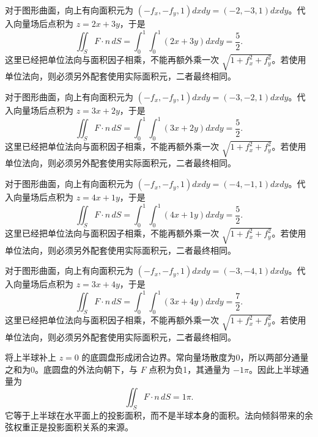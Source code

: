 \documentclass[UTF8,12pt,a4paper,fontset=fandol]{ctexart}
\begin{document}
\begin{solve}\label{ans:c42q9}
对于图形曲面，向上有向面积元为 $(-f_x,-f_y,1)dxdy=(-2,-3,1)dxdy$。代入向量场后点积为 $z=2x+3y$，于是
\[
\iint_SF\cdot n\,dS=\int_0^1\int_0^1(2x+3y)dxdy=\frac{5}{2}.
\]
这里已经把单位法向与面积因子相乘，不能再额外乘一次 $\sqrt{1+f_x^2+f_y^2}$。若使用单位法向，则必须另外配套使用实际面积元，二者最终相同。
\end{solve}

\begin{solve}\label{ans:c42q10}
对于图形曲面，向上有向面积元为 $(-f_x,-f_y,1)dxdy=(-3,-2,1)dxdy$。代入向量场后点积为 $z=3x+2y$，于是
\[
\iint_SF\cdot n\,dS=\int_0^1\int_0^1(3x+2y)dxdy=\frac{5}{2}.
\]
这里已经把单位法向与面积因子相乘，不能再额外乘一次 $\sqrt{1+f_x^2+f_y^2}$。若使用单位法向，则必须另外配套使用实际面积元，二者最终相同。
\end{solve}

\begin{solve}\label{ans:c42q11}
对于图形曲面，向上有向面积元为 $(-f_x,-f_y,1)dxdy=(-4,-1,1)dxdy$。代入向量场后点积为 $z=4x+1y$，于是
\[
\iint_SF\cdot n\,dS=\int_0^1\int_0^1(4x+1y)dxdy=\frac{5}{2}.
\]
这里已经把单位法向与面积因子相乘，不能再额外乘一次 $\sqrt{1+f_x^2+f_y^2}$。若使用单位法向，则必须另外配套使用实际面积元，二者最终相同。
\end{solve}

\begin{solve}\label{ans:c42q12}
对于图形曲面，向上有向面积元为 $(-f_x,-f_y,1)dxdy=(-3,-4,1)dxdy$。代入向量场后点积为 $z=3x+4y$，于是
\[
\iint_SF\cdot n\,dS=\int_0^1\int_0^1(3x+4y)dxdy=\frac{7}{2}.
\]
这里已经把单位法向与面积因子相乘，不能再额外乘一次 $\sqrt{1+f_x^2+f_y^2}$。若使用单位法向，则必须另外配套使用实际面积元，二者最终相同。
\end{solve}

\begin{solve}\label{ans:c42q13}
将上半球补上 $z=0$ 的底圆盘形成闭合边界。常向量场散度为0，所以两部分通量之和为0。底圆盘的外法向朝下，与 $F$ 点积为负1，其通量为 $-1\pi$。因此上半球通量为
\[
\iint_SF\cdot n\,dS=1\pi.
\]
它等于上半球在水平面上的投影面积，而不是半球本身的面积。法向倾斜带来的余弦权重正是投影面积关系的来源。
\end{solve}
\end{document}
